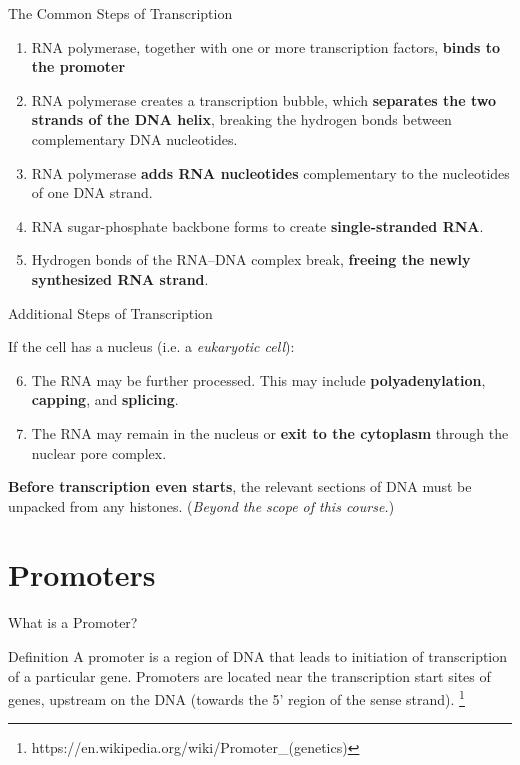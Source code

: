 \documentclass[aspectratio=169,11pt]{beamer}
\begin{document}
\begin{frame}{The Common Steps of Transcription}

	\begin{enumerate}
		\item RNA polymerase, together with one or more transcription factors, \textbf{binds to the promoter}
		\item RNA polymerase creates a transcription bubble, which \textbf{separates the two strands of the DNA helix}, breaking the hydrogen bonds between complementary DNA nucleotides.
		\item RNA polymerase \textbf{adds RNA nucleotides} complementary to the nucleotides of one DNA strand.
		\item RNA sugar-phosphate backbone forms to create \textbf{single-stranded RNA}.
		\item Hydrogen bonds of the RNA–DNA complex break, \textbf{freeing the newly synthesized RNA strand}.\\
	\end{enumerate}

\end{frame}

\begin{frame}{Additional Steps of Transcription}

If the cell has a nucleus (i.e. a \textit{eukaryotic cell}): \\

	\begin{enumerate}
	\setcounter{enumi}{5}

		\item The RNA may be further processed. This may include \textbf{polyadenylation}, \textbf{capping}, and \textbf{splicing}.
		\item The RNA may remain in the nucleus or \textbf{exit to the cytoplasm} through the nuclear pore complex.
	\end{enumerate}
	
\textbf{Before transcription even starts}, the relevant sections of DNA must be unpacked from any histones. (\textit{Beyond the scope of this course.})

\end{frame}

\section{Promoters}

\begin{frame}{What is a Promoter?}

	\begin{block}{Definition}
	A promoter is a region of DNA that leads to initiation of transcription of a particular gene. 
	Promoters are located near the transcription start sites of genes, upstream on the DNA (towards the 5' region of the sense strand). \footnote{https://en.wikipedia.org/wiki/Promoter\_(genetics)}
	\end{block}

\end{frame}
\end{document}
